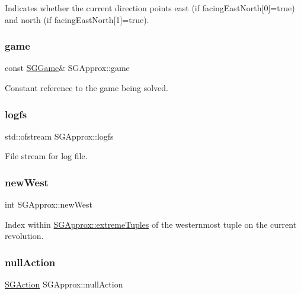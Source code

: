 Indicates whether the current direction points east (if facing\+East\+North\mbox{[}0\mbox{]}=true) and north (if facing\+East\+North\mbox{[}1\mbox{]}=true). \mbox{\label{classSGApprox_a0774e3ed0ff009809606a42c9e7ef727}} 
\subsubsection{\texorpdfstring{game}{game}}
{\footnotesize\ttfamily const \hyperlink{classSGGame}{S\+G\+Game}\& S\+G\+Approx\+::game\hspace{0.3cm}{\ttfamily [private]}}

Constant reference to the game being solved. \mbox{\label{classSGApprox_aa95ff6bda46617fbaa7cf1c8d6708748}} 
\subsubsection{\texorpdfstring{logfs}{logfs}}
{\footnotesize\ttfamily std\+::ofstream S\+G\+Approx\+::logfs\hspace{0.3cm}{\ttfamily [private]}}

File stream for log file. \mbox{\label{classSGApprox_aed002d6e06e7199e10b3ac4f27b6cb6c}} 
\subsubsection{\texorpdfstring{new\+West}{newWest}}
{\footnotesize\ttfamily int S\+G\+Approx\+::new\+West\hspace{0.3cm}{\ttfamily [private]}}

Index within \hyperlink{classSGApprox_ab0e2c4678401f806922ac64667ad5ff6}{S\+G\+Approx\+::extreme\+Tuples} of the westernmost tuple on the current revolution. \mbox{\label{classSGApprox_ad2aeb05506b86560b35a0a812f95c4be}} 
\subsubsection{\texorpdfstring{null\+Action}{nullAction}}
{\footnotesize\ttfamily \hyperlink{classSGAction}{S\+G\+Action} S\+G\+Approx\+::null\+Action\hspace{0.3cm}{\ttfamily [private]}}

